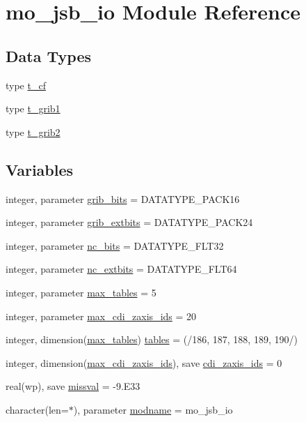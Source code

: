 \hypertarget{namespacemo__jsb__io}{}\section{mo\+\_\+jsb\+\_\+io Module Reference}
\label{namespacemo__jsb__io}
\subsection*{Data Types}
\begin{DoxyCompactItemize}
\item 
type \hyperlink{structmo__jsb__io_1_1t__cf}{t\+\_\+cf}
\item 
type \hyperlink{structmo__jsb__io_1_1t__grib1}{t\+\_\+grib1}
\item 
type \hyperlink{structmo__jsb__io_1_1t__grib2}{t\+\_\+grib2}
\end{DoxyCompactItemize}
\subsection*{Variables}
\begin{DoxyCompactItemize}
\item 
integer, parameter \hyperlink{namespacemo__jsb__io_aade09fd070010f905e77497f041ce6c3}{grib\+\_\+bits} = D\+A\+T\+A\+T\+Y\+P\+E\+\_\+\+P\+A\+C\+K16
\item 
integer, parameter \hyperlink{namespacemo__jsb__io_a63d67a0c59ef07ed57100a79ecd9a97f}{grib\+\_\+extbits} = D\+A\+T\+A\+T\+Y\+P\+E\+\_\+\+P\+A\+C\+K24
\item 
integer, parameter \hyperlink{namespacemo__jsb__io_a4bf2b656fa0a7acf938f0bfcad5870e3}{nc\+\_\+bits} = D\+A\+T\+A\+T\+Y\+P\+E\+\_\+\+F\+L\+T32
\item 
integer, parameter \hyperlink{namespacemo__jsb__io_ab5ba0ea9f2dcab7f2a4adf01e662d3c2}{nc\+\_\+extbits} = D\+A\+T\+A\+T\+Y\+P\+E\+\_\+\+F\+L\+T64
\item 
integer, parameter \hyperlink{namespacemo__jsb__io_a7c89ecf533d68304c7e50b8c2f367dd5}{max\+\_\+tables} = 5
\item 
integer, parameter \hyperlink{namespacemo__jsb__io_a5ec7d03d66e8d6e79f41665e227be609}{max\+\_\+cdi\+\_\+zaxis\+\_\+ids} = 20
\item 
integer, dimension(\hyperlink{namespacemo__jsb__io_a7c89ecf533d68304c7e50b8c2f367dd5}{max\+\_\+tables}) \hyperlink{namespacemo__jsb__io_aefd9f08b763f8c7b6f4cdbc576e3dd14}{tables} = (/186, 187, 188, 189, 190/)
\item 
integer, dimension(\hyperlink{namespacemo__jsb__io_a5ec7d03d66e8d6e79f41665e227be609}{max\+\_\+cdi\+\_\+zaxis\+\_\+ids}), save \hyperlink{namespacemo__jsb__io_a40fcb52ae787aaf48e1497bf80759dfb}{cdi\+\_\+zaxis\+\_\+ids} = 0
\item 
real(wp), save \hyperlink{namespacemo__jsb__io_a390ce09c37f32f811fcbc4988d94dec9}{missval} = -\/9.E33
\item 
character(len=$\ast$), parameter \hyperlink{namespacemo__jsb__io_a610da1f729e46e7946c4b868a8f677c2}{modname} = \textquotesingle{}mo\+\_\+jsb\+\_\+io\textquotesingle{}
\end{DoxyCompactItemize}



